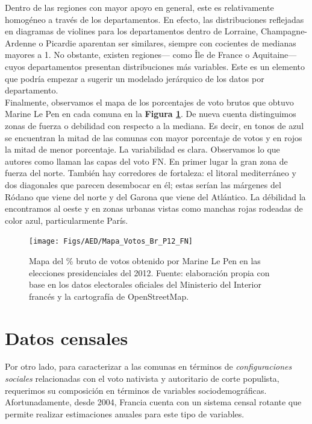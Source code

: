 Dentro de las regiones con mayor apoyo en general, este es relativamente homogéneo a través de los departamentos. En efecto, las distribuciones reflejadas en diagramas de violines para los departamentos dentro de Lorraine, Champagne-Ardenne o Picardie aparentan ser similares, siempre con cocientes de medianas mayores a 1. No obstante, existen regiones--- como Île de France o Aquitaine--- cuyos departamentos presentan distribuciones más variables. Este es un elemento que podría empezar a sugerir un modelado jerárquico de los datos por departamento.\\

Finalmente, observamos el mapa de los porcentajes de voto brutos que obtuvo Marine Le Pen en cada comuna en la \textbf{Figura \ref{fig:Mapa_Pct_Br}}. De nueva cuenta distinguimos zonas de fuerza o debilidad con respecto a la mediana. Es decir, en tonos de azul se encuentran la mitad de las comunas con mayor porcentaje de votos y en rojos la mitad de menor porcentaje. La variabilidad es clara. Observamos lo que autores como \textcite{LeBras15} llaman las capas del voto FN. En primer lugar la gran zona de fuerza del norte. También hay corredores de fortaleza: el litoral mediterráneo y dos diagonales que parecen desembocar en él; estas serían las márgenes del Ródano que viene del norte y del Garona que viene del Atlántico. La débilidad la encontramos al oeste y en zonas urbanas vistas como manchas rojas rodeadas de color azul, particularmente París.\\ 

\begin{figure}[h]
	\centering
	\texttt{[image: Figs/AED/Mapa\_Votos\_Br\_P12\_FN]}
	\caption{Mapa del \% bruto de votos obtenido por Marine Le Pen en las elecciones presidenciales del 2012. Fuente: elaboración propia con base en los datos electorales oficiales del Ministerio del Interior francés y la cartografía de OpenStreetMap.}
	\label{fig:Mapa_Pct_Br}	
\end{figure}

\section{Datos censales}

Por otro lado, para caracterizar a las comunas en términos de \textit{configuraciones sociales} relacionadas con el voto nativista y autoritario de corte populista, requerimos su composición en términos de variables sociodemográficas. Afortunadamente, desde 2004, Francia cuenta con un sistema censal rotante que permite realizar estimaciones anuales para este tipo de variables.\\ 

